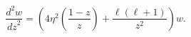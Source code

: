 \[\frac{{d}^{2}w}{{dz}^{2}}=\left(4\eta^{2}\left(\frac{1-z}{z}\right)+\frac{\ell%
(\ell+1)}{z^{2}}\right)w.\]